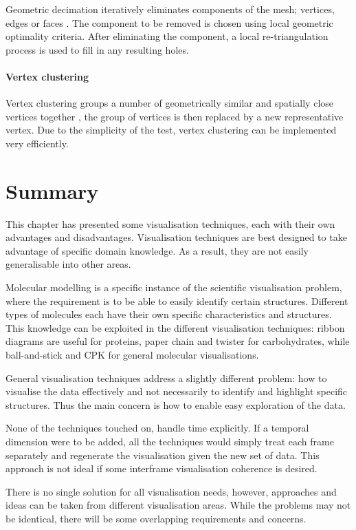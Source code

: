 Geometric decimation iteratively eliminates components of the mesh; vertices,
edges or faces \citep{schroeder92}. The component to be removed is chosen using
local geometric optimality criteria. After eliminating the component, a local
re-triangulation process is used to fill in any resulting holes.


\paragraph{Vertex clustering}

Vertex clustering groups a number of geometrically similar and spatially close
vertices together \citep{rossignac93}, the group of vertices is then replaced
by a new representative vertex.  Due to the simplicity of the test, vertex
clustering can be implemented very efficiently.



\section{Summary}
\label{sec:background_end}

This chapter has presented some visualisation techniques, each with their own
advantages and disadvantages. Visualisation techniques are best designed to
take advantage of specific domain knowledge. As a result, they are not easily
generalisable into other areas.

Molecular modelling is a specific instance of the scientific visualisation
problem, where the requirement is to be able to easily identify certain
structures. Different types of molecules each have their own specific
characteristics and structures. This knowledge can be exploited in the
different visualisation techniques: ribbon diagrams are useful for proteins,
paper chain and twister for carbohydrates, while ball-and-stick and CPK for
general molecular visualisations.

General visualisation techniques address a slightly different problem: how to
visualise the data effectively and not necessarily to identify and highlight
specific structures. Thus the main concern is how to enable easy exploration of
the data.

None of the techniques touched on, handle time explicitly. If a temporal
dimension were to be added, all the techniques would simply treat each frame
separately and regenerate the visualisation given the new set of data. This
approach is not ideal if some interframe visualisation coherence is desired.

There is no single solution for all visualisation needs, however, approaches and
ideas can be taken from different visualisation areas. While the problems may
not be identical, there will be some overlapping requirements and concerns.



